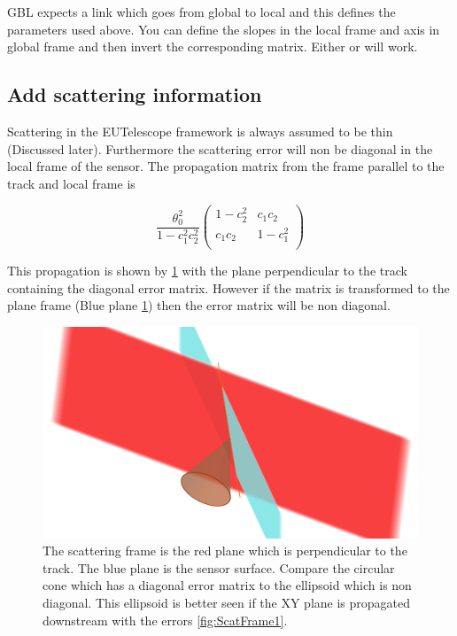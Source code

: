 GBL expects a link which goes from global to local and this defines the parameters used above. You can define the slopes in the local frame and axis in global frame and then invert the corresponding matrix. Either or will work.



\subsection{Add scattering information}
\label{sec:scat}
Scattering in the EUTelescope framework is always assumed to be thin (Discussed later). Furthermore the scattering error will non be diagonal in the local frame of the sensor. The propagation matrix from the frame parallel to the track and local frame is

\[ 
\frac{\theta_{0}^{2}}{1-c^2_1 c^2_2}
\left(
  \begin{array}{cc}
 1-c^{2}_{2} & c_{1}c_{2}    \\
 c_{1}c_{2} & 1-c^{2}_{1} \\   
\end{array} \right)\] 



This propagation is shown by \ref{fig:ScatFrame} with the plane perpendicular to the track containing the diagonal error matrix. However if the matrix is transformed to the plane frame (Blue plane \ref{fig:ScatFrame}) then the error matrix will be non diagonal.

\begin{figure}[H]
\centering
\includegraphics[width=1.0\linewidth]{figures/propGood600.png}
\caption{The scattering frame is the red plane which is perpendicular to the track. The blue plane is the sensor surface. Compare the circular cone which has a diagonal error matrix to the ellipsoid which is non diagonal. This ellipsoid is better seen if the XY plane is propagated downstream with the errors \ref{fig:ScatFrame1}.}
\label{fig:ScatFrame}
\end{figure}

